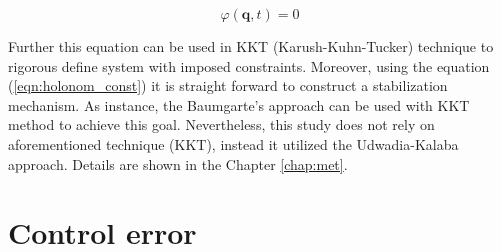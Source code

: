 \begin{equation}
    \label{eqn:holonom_const}
    \varphi (\mathbf{q}, t) = 0
\end{equation}

Further this equation can be used in KKT (Karush-Kuhn-Tucker) technique to 
rigorous define system with imposed constraints. Moreover, using the equation
(\ref{eqn:holonom_const}) it is straight forward to construct a stabilization 
mechanism. As instance, the Baumgarte's approach can be used with KKT method 
to achieve this goal. Nevertheless, this study does not rely on aforementioned 
technique (KKT), instead it utilized the Udwadia-Kalaba approach. Details are 
shown in the Chapter \ref{chap:met}.

\section{Control error} \label{sec:control_error}
